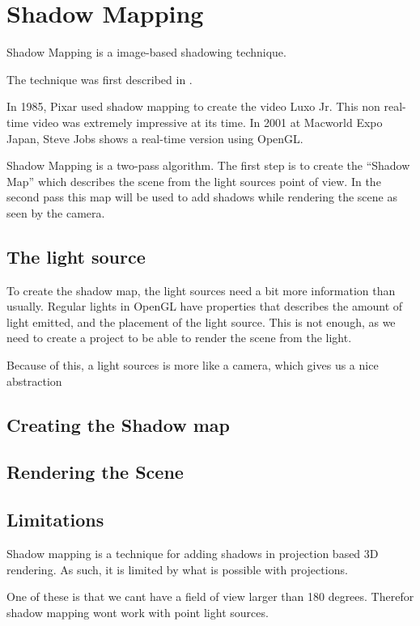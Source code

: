 
\section{Shadow Mapping}

Shadow Mapping is a image-based shadowing technique.

The technique was first described in \cite{lance78}.

In 1985, Pixar used shadow mapping to create the video Luxo Jr. This
non real-time video was extremely impressive at its time.
In 2001 at Macworld Expo Japan, Steve Jobs shows a real-time version
using OpenGL.


Shadow Mapping is a two-pass algorithm. The first step is to create
the ``Shadow Map'' which describes the scene from the light sources
point of view. In the second pass this map will be used to add shadows
while rendering the scene as seen by the camera.


\subsection{The light source}

To create the shadow map, the light sources need a bit more
information than usually. Regular lights in OpenGL have properties
that describes the amount of light emitted, and the placement of the
light source. This is not enough, as we need to create a project to be
able to render the scene from the light. 

Because of this, a light sources is more like a camera, which gives us
a nice abstraction


\subsection{Creating the Shadow map}


\subsection{Rendering the Scene}

\subsection{Limitations}



Shadow mapping is a technique for adding shadows in projection based 
3D rendering. As such, it is limited by what is possible with projections.

One of these is that we cant have a field of view larger than 180
degrees. Therefor shadow mapping wont work with point
light sources.

